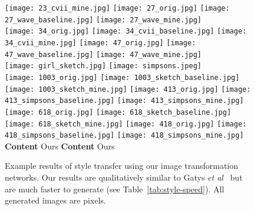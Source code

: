 \documentclass[runningheads]{llncs}
\newcommand{\etal}{\textit{et al}}
\begin{document}
\begin{figure}
  \texttt{[image: 23\_cvii\_mine.jpg]}
  \texttt{[image: 27\_orig.jpg]}
  \texttt{[image: 27\_wave\_baseline.jpg]}
  \texttt{[image: 27\_wave\_mine.jpg]} \\
  \texttt{[image: 34\_orig.jpg]}
  \texttt{[image: 34\_cvii\_baseline.jpg]}
  \texttt{[image: 34\_cvii\_mine.jpg]}
  \texttt{[image: 47\_orig.jpg]}
  \texttt{[image: 47\_wave\_baseline.jpg]}
  \texttt{[image: 47\_wave\_mine.jpg]} \\
  \hspace*{12mm}
  \texttt{[image: girl\_sketch.jpg]}
  \hspace{8mm}
  \texttt{[image: simpsons.jpeg]} \\
\texttt{[image: 1003\_orig.jpg]}
  \texttt{[image: 1003\_sketch\_baseline.jpg]}
  \texttt{[image: 1003\_sketch\_mine.jpg]}
  \texttt{[image: 413\_orig.jpg]}
  \texttt{[image: 413\_simpsons\_baseline.jpg]}
  \texttt{[image: 413\_simpsons\_mine.jpg]} \\
  \texttt{[image: 618\_orig.jpg]}
  \texttt{[image: 618\_sketch\_baseline.jpg]}
  \texttt{[image: 618\_sketch\_mine.jpg]} 
  \texttt{[image: 418\_orig.jpg]}
  \texttt{[image: 418\_simpsons\_baseline.jpg]}
  \texttt{[image: 418\_simpsons\_mine.jpg]} \\
  \hspace*{2.5mm} \textbf{Content}
  \hspace{9mm} \cite{gatys2015neural}
  \hspace{12mm} Ours
  \hspace{9.5mm} \textbf{Content}
  \hspace{9mm} \cite{gatys2015neural}
  \hspace{12mm} Ours \\
  \vspace{-5mm}
  \caption{Example results of style transfer using our image transformation networks.
    Our results are qualitatively similar to Gatys \etal~\cite{gatys2015neural}
    but are much faster to generate (see Table~\ref{tab:style-speed}).
    All generated images are  pixels.
  }
  \label{fig:style-results}
\end{figure}
\end{document}
